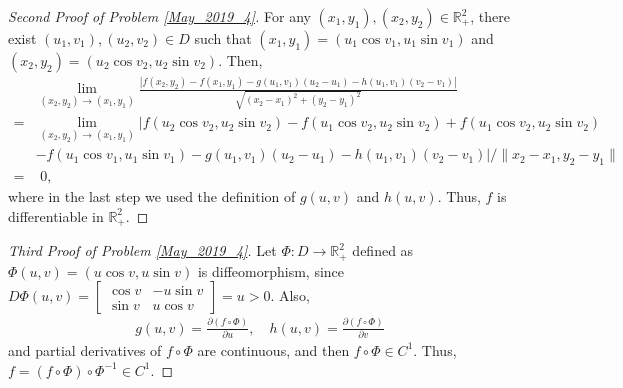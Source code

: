 \documentclass[11pt]{article}
\theoremstyle{definition}
\numberwithin{equation}{subsection}
\begin{document}
\begin{proof}[Second Proof of Problem \ref{May_2019_4}]
For any $(x_1, y_1), (x_2, y_2) \in \mathbb{R}^2_+$, there exist $(u_1, v_1), (u_2, v_2) \in D$ such that $(x_1, y_1) = (u_1 \cos v_1, u_1 \sin v_1)$ and $(x_2, y_2) = (u_2 \cos v_2, u_2 \sin v_2)$. Then,
\begin{align*}
    & \lim_{(x_2,y_2) \to (x_1,y_1)} \frac{\left|f(x_2,y_2) - f(x_1,y_1) - g(u_1,v_1)(u_2 - u_1) - h(u_1,v_1)(v_2 - v_1) \right|}{\sqrt{(x_2-x_1)^2 + (y_2-y_1)^2}} \\
    = & \lim_{(x_2,y_2) \to (x_1,y_1)} | f(u_2 \cos v_2, u_2 \sin v_2) - f(u_1 \cos v_2, u_2 \sin v_2) + f(u_1 \cos v_2, u_2 \sin v_2) \\
    & - f(u_1 \cos v_1, u_1 \sin v_1) - g(u_1,v_1)(u_2 - u_1) - h(u_1,v_1)(v_2 - v_1)| / \|x_2-x_1, y_2-y_1\| \\
    = &\,\,  0,
\end{align*}
where in the last step we used the definition of $g(u,v)$ and $h(u,v)$. Thus, $f$ is differentiable in $\mathbb{R}^2_+$.
\end{proof}

\medskip

\begin{proof}[Third Proof of Problem \ref{May_2019_4}]
Let $\Phi: D \to \mathbb{R}^2_+$ defined as $\Phi(u,v) = (u \cos v, u \sin v)$ is diffeomorphism, since $D\Phi(u,v) = \begin{bmatrix} \cos v & -u \sin v \\ \sin v & u \cos v \end{bmatrix} = u > 0$. Also,
\begin{align*}
    g(u,v) = \frac{\partial (f \circ \Phi)}{\partial u}, \quad h(u,v) = \frac{\partial (f \circ \Phi)}{\partial v}
\end{align*}
and partial derivatives of $f \circ \Phi$ are continuous, and then $f \circ \Phi \in C^1$. Thus, $f = (f \circ \Phi) \circ \Phi^{-1} \in C^1$.
\end{proof}

\medskip
\end{document}
